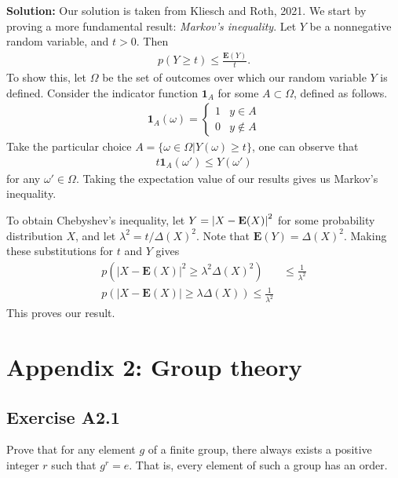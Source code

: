 \documentclass{book}
\begin{document}
    \textbf{Solution:} Our solution is taken from Kliesch and Roth, 2021. We start by proving  a more fundamental result: \emph{Markov's inequality}. Let $Y$ be a nonnegative random variable, and $t>0$. Then
    \begin{align}
        p(Y\geq t) \leq \frac{\textbf{E}(Y)}{t}.
    \end{align}
    To show this, let $\Omega$ be the set of outcomes over which our random variable $Y$ is defined. Consider the indicator function $\textbf{1}_A$ for some $A\subset\Omega$, defined as follows.
    \begin{align}
        \textbf{1}_A (\omega) = 
        \begin{cases}
            1 & y\in A \\
            0 & y \notin A
        \end{cases}
    \end{align}
    Take the particular choice $A = \{\omega\in \Omega| Y(\omega)\geq t\}$, one can observe that
    \begin{align}
        t \textbf{1}_A (\omega')\leq Y(\omega')
    \end{align}
    for any $\omega' \in \Omega$. Taking the expectation value of our results gives us Markov's inequality.
    
    To obtain Chebyshev's inequality, let $Y = \abs{X-\textbf{E}(X)}^2$ for some probability distribution $X$, and let $\lambda^2 = t/\Delta(X)^2$. Note that $\mathbf{E}(Y) = \Delta (X)^2$. Making these substitutions for $t$ and $Y$ gives
    \begin{align}
        p(|X-\mathbf{E}(X)|^2 \geq \lambda^2 \Delta(X)^2) &\leq \frac{1}{\lambda^2} \\
        p(|X-\mathbf{E}(X)|\geq \lambda\Delta(X)) \leq \frac{1}{\lambda^2}
    \end{align}
    This proves our result.


\chapter*{Appendix 2: Group theory}


\section*{Exercise A2.1}
    Prove that for any element $g$ of a finite group, there always exists a positive integer $r$ such that $g^r = e$. That is, every element of such a group has an order.
    
\end{document}
